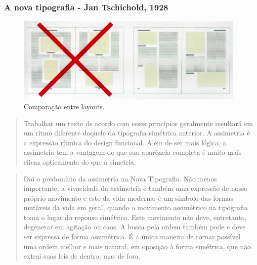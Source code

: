 \begin{frame}[allowframebreaks]
\frametitle{A nova tipografia - Jan Tschichold, 1928}
\begin{figure}[htbp]
\centering
\includegraphics[width=\textwidth,height=0.5\textheight,keepaspectratio]{figures/jan-tschichold.png}
\caption{Comparação entre layouts.}
\label{fig-jan-tschichold}
\end{figure}

\begin{quote}
Trabalhar um texto de acordo com esses princípios geralmente resultará em um
ritmo diferente daquele da tipografia simétrica anterior. A assimetria é a
expressão rítmica do design funcional. Além de ser mais lógica, a assimetria
tem a vantagem de que sua aparência completa é muito mais eficaz opticamente do
que a simetria.
\end{quote}

\begin{quote} 
Daí o predomínio da assimetria na Nova Tipografia. Não menos importante, a
vivacidade da assimetria é também uma expressão de nosso próprio movimento e
este da vida moderna; é um símbolo das formas mutáveis da vida em geral, quando
o movimento assimétrico na tipografia toma o lugar do repouso simétrico. Este
movimento não deve, entretanto, degenerar em agitação ou caos. A busca pela
ordem também pode e deve ser expressa de forma assimétrica. É a única maneira
de tornar possível uma ordem melhor e mais natural, em oposição à forma
simétrica, que não extrai suas leis de dentro, mas de fora. 
\end{quote}


\end{frame}
